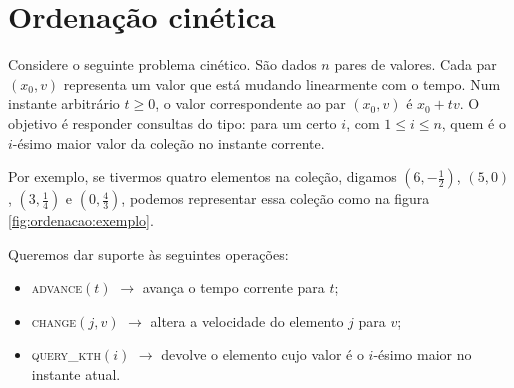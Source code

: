
\chapter{Ordenação cinética}
Considere o seguinte problema cinético. São dados $n$ pares de
valores. Cada par $(x_0, v)$ representa um valor que está mudando
linearmente com o tempo. Num instante arbitrário $t \geq 0$, o valor
correspondente ao par $(x_0, v)$ é $x_0 + tv$. O objetivo é
responder consultas do tipo: para um certo $i$, com $1 \leq i \leq
n$, quem é o $i$-ésimo maior valor da coleção no instante corrente.

Por exemplo, se tivermos quatro elementos na coleção, digamos
$\left(6, -\frac{1}{2}\right)$, $(5, 0)$, $\left(3,
\frac{1}{4}\right)$ e $\left(0, \frac{4}{3}\right)$, podemos
representar essa coleção como na figura \ref{fig:ordenacao:exemplo}.



\newpage

Queremos dar suporte às seguintes operações:
\begin{itemize}
    \item \textsc{advance}$(t)$ $\rightarrow$ avança o tempo
    corrente para $t$;
    \item \textsc{change}$(j, v)$ $\rightarrow$ altera a
    velocidade do elemento $j$ para $v$;
    \item \textsc{query\_kth}$(i)$ $\rightarrow$ devolve o
    elemento cujo valor é o $i$-ésimo maior no instante atual.
\end{itemize}


